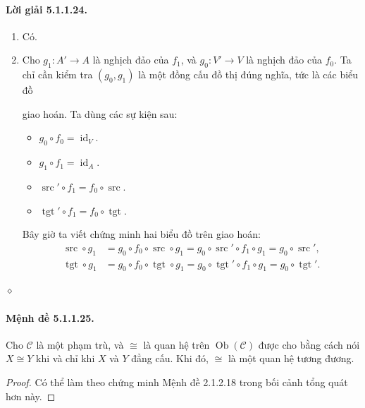 \paragraph{Lời giải 5.1.1.24.}
\begin{enumerate}[label=\alph*.]
\item Có.
\item Cho $g_1:A'\to A$ là nghịch đảo của $f_1$, và $g_0:V'\to V$ là nghịch đảo của $f_0$. Ta chỉ cần kiểm tra $(g_0,g_1)$ là một đồng cấu đồ thị đúng nghĩa, tức là các biểu đồ
\begin{center}
\qquad
{}
\end{center}
giao hoán. Ta dùng các sự kiện sau:
\begin{itemize}
\item $g_0\circ f_0=\operatorname{id}_V$.
\item $g_1\circ f_1=\operatorname{id}_A$.
\item $\operatorname{src}'\circ f_1=f_0\circ\operatorname{src}$.
\item $\operatorname{tgt}'\circ f_1=f_0\circ\operatorname{tgt}$.
\end{itemize}
Bây giờ ta viết chứng minh hai biểu đồ trên giao hoán:
\begin{align*}
\operatorname{src}\circ g_1&=g_0\circ f_0\circ\operatorname{src}\circ g_1=g_0\circ\operatorname{src}'\circ f_1\circ g_1=g_0\circ\operatorname{src}',\\
\operatorname{tgt}\circ g_1&=g_0\circ f_0\circ\operatorname{tgt}\circ g_1=g_0\circ\operatorname{tgt}'\circ f_1\circ g_1=g_0\circ\operatorname{tgt}'.
\end{align*}
\end{enumerate}\hfill$\diamond$
\paragraph{Mệnh đề 5.1.1.25.} Cho $\mathcal C$ là một phạm trù, và $\cong$ là quan hệ trên $\operatorname{Ob}(\mathcal C)$ được cho bằng cách nói $X\cong Y$ khi và chỉ khi $X$ và $Y$ đẳng cấu. Khi đó, $\cong$ là một quan hệ tương đương.
\begin{proof}Có thể làm theo chứng minh Mệnh đề 2.1.2.18 trong bối cảnh tổng quát hơn này.\end{proof}
